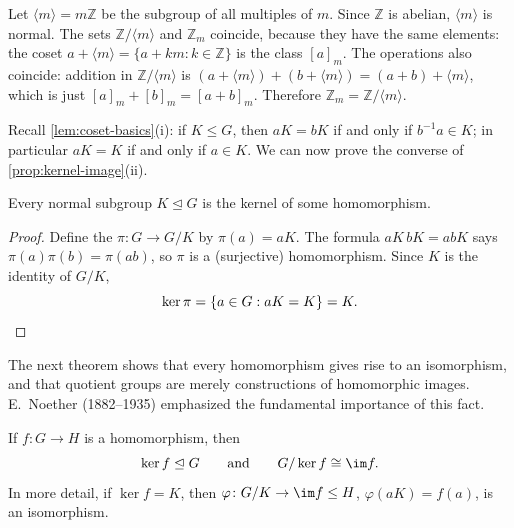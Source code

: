 \begin{eg}[\(\mathbb Z/\langle m\rangle = \mathbb Z_m\)]\label{eg:Z-mod-m}
	Let \(\langle m\rangle = m\mathbb Z\) be the subgroup of all multiples of \(m\).
	Since \(\mathbb Z\) is abelian, \(\langle m\rangle\) is normal. The sets
	\(\mathbb Z/\langle m\rangle\) and \(\mathbb Z_m\) coincide, because they have the same
	elements: the coset \(a + \langle m\rangle = \{a + km : k \in \mathbb Z\}\) is the class
	\([a]_m\). The operations also coincide: addition in \(\mathbb Z/\langle m\rangle\) is
	\((a + \langle m\rangle) + (b + \langle m\rangle) = (a+b) + \langle m\rangle\), which is
	just \([a]_m + [b]_m = [a+b]_m\). Therefore \(\mathbb Z_m = \mathbb Z/\langle m\rangle\).
\end{eg}

Recall \autoref{lem:coset-basics}(i): if \(K \leq G\), then \(aK = bK\) if and only if
\(b^{-1}a \in K\); in particular \(aK = K\) if and only if \(a \in K\). We can now prove
the converse of \autoref{prop:kernel-image}(ii).

\begin{corollary}\label{cor:normal-is-kernel}
	Every normal subgroup \(K \trianglelefteq G\) is the kernel of some homomorphism.
\end{corollary}

\begin{proof}
	Define the  \(\pi\colon G \to G/K\) by \(\pi(a) = aK\). The formula
	\(aK\,bK = abK\) says \(\pi(a)\pi(b) = \pi(ab)\), so \(\pi\) is a (surjective)
	homomorphism. Since \(K\) is the identity of \(G/K\),
	\[
		\ker\pi = \{a \in G : aK = K\} = K. \qedhere
	\]
\end{proof}

The next theorem shows that every homomorphism gives rise to an isomorphism, and that
quotient groups are merely constructions of homomorphic images. E.~Noether (1882--1935)
emphasized the fundamental importance of this fact.

\begin{theorem}\label{thm:first-iso}
	If \(f\colon G \to H\) is a homomorphism, then
	\[
		\ker f \trianglelefteq G \qquad\text{and}\qquad G/\ker f \cong \im f.
	\]
	In more detail, if \(\ker f = K\), then \(\varphi\colon G/K \to \im f \leq H\),
	\(\varphi(aK) = f(a)\), is an isomorphism.
\end{theorem}

